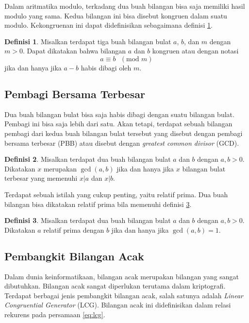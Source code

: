 \documentclass[10pt,conference]{IEEEtran}
\theoremstyle{definition}
\newtheorem{definition}{Definisi}[section]
\begin{document}
Dalam aritmatika modulo, terkadang dua buah bilangan bisa saja memiliki hasil modulo yang sama. Kedua bilangan ini bisa disebut kongruen dalam suatu modulo. Kekongruenan ini dapat
didefinisikan sebagaimana definisi \ref{def:congruent}.

\begin{definition} \label{def:congruent}
    Misalkan terdapat tiga buah bilangan bulat $a$, $b$, dan $m$ dengan $m > 0$. Dapat dikatakan bahwa bilangan $a$ dan $b$ kongruen atau dengan notasi
    $$ a \equiv b \text{ } (\text{mod } m) $$
    jika dan hanya jika $a-b$ habis dibagi oleh $m$.
\end{definition}

\subsection{Pembagi Bersama Terbesar}
Dua buah bilangan bulat bisa saja habis dibagi dengan suatu bilangan bulat. Pembagi ini bisa saja lebih dari satu. Akan tetapi, terdapat sebuah bilangan pembagi dari kedua buah bilangan
bulat tersebut yang disebut dengan pembagi bersama terbesar (PBB) atau disebut dengan \emph{greatest common divisor} (GCD). 

\begin{definition} \label{def:gcd}
    Misalkan terdapat dua buah bilangan bulat $a$ dan $b$ dengan $a,b > 0$. Dikatakan $x$ merupakan $\gcd{(a,b)}$ jika dan hanya jika $x$ bilangan bulat terbesar yang memenuhi $x | a$ dan $x | b$.
\end{definition}

Terdapat sebuah istilah yang cukup penting, yaitu relatif prima. Dua buah bilangan bisa dikatakan relatif prima bila memenuhi definisi \ref{def:relativeprime}.

\begin{definition} \label{def:relativeprime}
    Misalkan terdapat dua buah bilangan bulat $a$ dan $b$ dengan $a,b > 0$. Dikatakan $a$ relatif prima dengan $b$ jika dan hanya jika $\gcd{(a,b)} = 1$.
\end{definition}

\subsection{Pembangkit Bilangan Acak}
Dalam dunia keinformatikaan, bilangan acak merupakan bilangan yang sangat dibutuhkan. Bilangan acak sangat diperlukan terutama dalam kriptografi. Terdapat berbagai jenis pembangkit bilangan acak,
salah satunya adalah \emph{Linear Congruential Generator} (LCG). Bilangan acak ini didefinisikan dalam relasi rekurens pada persamaan \ref{eq:lcg}.
\end{document}
